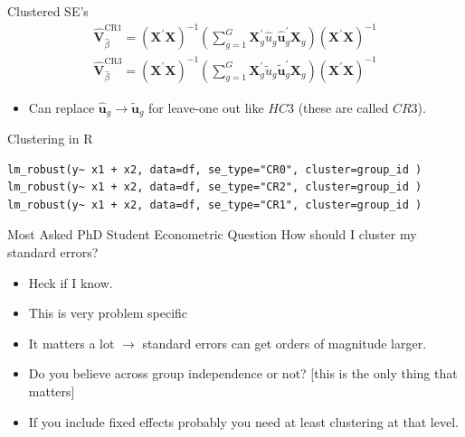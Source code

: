\documentclass[aspectratio=169]{beamer}
\begin{document}
\begin{frame}{Clustered SE's}
\begin{align*}
\widehat { \boldsymbol { V } } _ { \hat { \beta } } ^ { \mathrm { CR } 1 } = \left( \boldsymbol { X } ^ { \prime } \boldsymbol { X } \right) ^ { - 1 } \left( \sum _ { g = 1 } ^ { G } \boldsymbol { X } _ { g } ^ { \prime } \widehat { u } _ { g } \widehat { \boldsymbol { u } } _ { g } ^ { \prime } \boldsymbol { X } _ { g } \right) \left( \boldsymbol { X } ^ { \prime } \boldsymbol { X } \right) ^ { - 1 }\\
\widehat { \boldsymbol { V } } _ { \hat { \beta } } ^ { \mathrm { CR } 3 } = \left( \boldsymbol { X } ^ { \prime } \boldsymbol { X } \right) ^ { - 1 } \left( \sum _ { g = 1 } ^ { G } \boldsymbol { X } _ { g } ^ { \prime } \widetilde { u } _ { g } \widetilde { \boldsymbol { u } } _ { g } ^ { \prime } \boldsymbol { X } _ { g } \right) \left( \boldsymbol { X } ^ { \prime } \boldsymbol { X } \right) ^ { - 1 }
\end{align*}
\begin{itemize}
\item Can replace  $\hat { \mathbf{u}}_g  \rightarrow \tilde { \mathbf{u}}_g $ for leave-one out like $HC3$ (these are called $CR3$).
\end{itemize}
\end{frame}


\begin{frame}[fragile]{Clustering in R}
\begin{verbatim}
lm_robust(y~ x1 + x2, data=df, se_type="CR0", cluster=group_id )
lm_robust(y~ x1 + x2, data=df, se_type="CR2", cluster=group_id )
lm_robust(y~ x1 + x2, data=df, se_type="CR1", cluster=group_id )
\end{verbatim}
\end{frame}


\begin{frame}{Most Asked PhD Student Econometric Question}
 How should I cluster my standard errors?
\begin{itemize}
\item Heck if I know.
\item This is very problem specific
\item It matters a lot $\rightarrow$ standard errors can get orders of magnitude larger.
\item Do you believe across group independence or not? [this is the only thing that matters]
\item If you include \alert{fixed effects} probably you need at least clustering at that level.
\end{itemize}
\end{frame}
\end{document}
